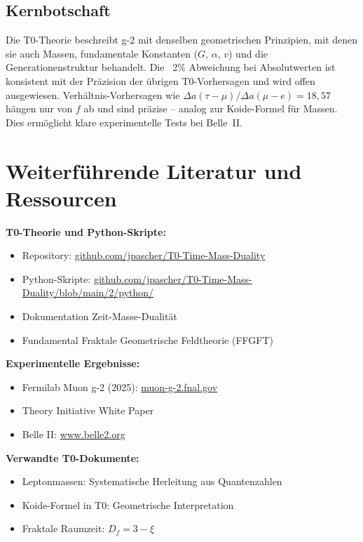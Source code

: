 	\subsection{Kernbotschaft}
	
	\begin{keypoint}
		Die T0-Theorie beschreibt g-2 mit denselben geometrischen Prinzipien, mit denen sie auch Massen, fundamentale Konstanten ($G$, $\alpha$, $v$) und die Generationenstruktur behandelt. Die ~2\% Abweichung bei Absolutwerten ist konsistent mit der Präzision der übrigen T0-Vorhersagen und wird offen ausgewiesen. Verhältnis-Vorhersagen wie $\Delta a(\tau - \mu) / \Delta a(\mu - e) = 18{,}57$ hängen nur von $f$ ab und sind präzise -- analog zur Koide-Formel für Massen. Dies ermöglicht klare experimentelle Tests bei Belle~II.
	\end{keypoint}
	
	\section*{Weiterführende Literatur und Ressourcen}
	
	\textbf{T0-Theorie und Python-Skripte:}
	\begin{itemize}
		\item Repository: \href{https://github.com/jpascher/T0-Time-Mass-Duality}{github.com/jpascher/T0-Time-Mass-Duality}
		\item Python-Skripte: \href{https://github.com/jpascher/T0-Time-Mass-Duality/blob/main/2/python/}{github.com/jpascher/T0-Time-Mass-Duality/blob/main/2/python/}
		\item Dokumentation Zeit-Masse-Dualität
		\item Fundamental Fraktale Geometrische Feldtheorie (FFGFT)
	\end{itemize}
	
	\textbf{Experimentelle Ergebnisse:}
	\begin{itemize}
		\item Fermilab Muon g-2 (2025): \href{https://muon-g-2.fnal.gov/}{muon-g-2.fnal.gov}
		\item Theory Initiative White Paper
		\item Belle II: \href{https://www.belle2.org/}{www.belle2.org}
	\end{itemize}
	
	\textbf{Verwandte T0-Dokumente:}
	\begin{itemize}
		\item Leptonmassen: Systematische Herleitung aus Quantenzahlen
		\item Koide-Formel in T0: Geometrische Interpretation
		\item Fraktale Raumzeit: $D_f = 3 - \xi$
	\end{itemize}
	